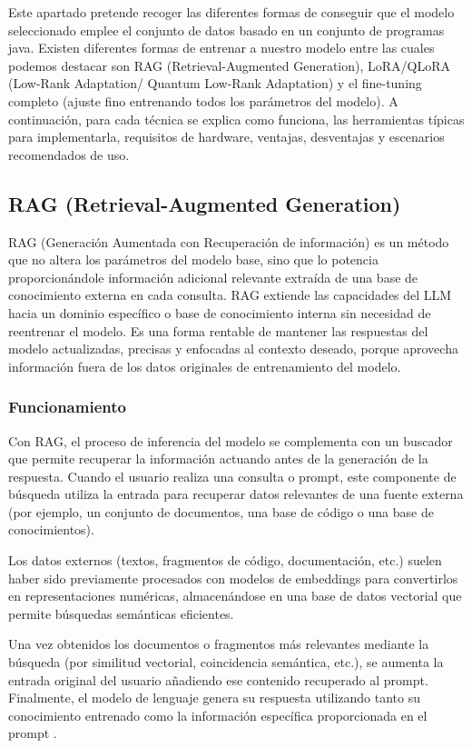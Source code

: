 Este apartado pretende recoger las diferentes formas de conseguir que el modelo seleccionado emplee el conjunto de datos basado en un conjunto de programas java. Existen diferentes formas de entrenar a nuestro modelo entre las cuales podemos destacar son  RAG (Retrieval-Augmented Generation), LoRA/QLoRA (Low-Rank Adaptation/ Quantum  Low-Rank Adaptation) y el fine-tuning completo (ajuste fino entrenando todos los parámetros del modelo). A continuación, para cada técnica se explica como  funciona, las herramientas típicas para implementarla, requisitos de hardware, ventajas, desventajas y escenarios recomendados de uso. 
\subsection{RAG (Retrieval-Augmented Generation)}
RAG (Generación Aumentada con Recuperación de información) es un método que no altera los parámetros del modelo base, sino que lo potencia proporcionándole información adicional relevante extraída de una base de conocimiento externa en cada consulta. RAG extiende las capacidades del LLM hacia un dominio específico o base de conocimiento interna sin necesidad de reentrenar el modelo. Es una forma rentable de mantener las respuestas del modelo actualizadas, precisas y enfocadas al contexto deseado, porque aprovecha información fuera de los datos originales de entrenamiento del modelo.\cite{RAG-Amazon}

\subsubsection{Funcionamiento}
Con RAG, el proceso de inferencia del modelo se complementa con un buscador que permite recuperar la información actuando antes de la generación de la respuesta. Cuando el usuario realiza una consulta o prompt, este componente de búsqueda utiliza la entrada para recuperar datos relevantes de una fuente externa (por ejemplo, un conjunto de documentos, una base de código o una base de conocimientos)\cite{RAG-Amazon}.

Los datos externos (textos, fragmentos de código, documentación, etc.) suelen haber sido previamente procesados con modelos de embeddings para convertirlos en representaciones numéricas, almacenándose en una base de datos vectorial que permite búsquedas semánticas eficientes\cite{RAG-Amazon}.

Una vez obtenidos los documentos o fragmentos más relevantes mediante la búsqueda (por similitud vectorial, coincidencia semántica, etc.), se aumenta la entrada original del usuario añadiendo ese contenido recuperado al prompt. Finalmente, el modelo de lenguaje genera su respuesta utilizando tanto su conocimiento entrenado como la información específica proporcionada en el prompt \cite{RAG-Amazon}.

